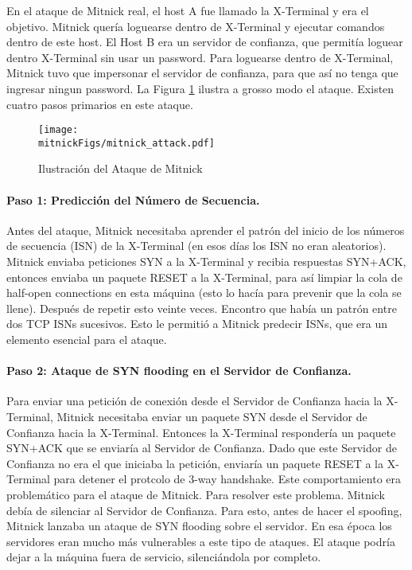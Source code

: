 En el ataque de Mitnick real, el host A fue llamado la X-Terminal y era el objetivo. Mitnick quería loguearse dentro de X-Terminal y ejecutar comandos dentro de este host.
El Host B era un servidor de confianza, que permitía loguear dentro X-Terminal sin usar un password.
Para loguearse dentro de X-Terminal, Mitnick tuvo que impersonar el servidor de confianza, para que así no tenga que ingresar ningun password. La Figura \ref{tcp:mitnick} ilustra a grosso modo el ataque.
Existen cuatro pasos primarios en este ataque.


\begin{figure}[htb]
\centering
\texttt{[image: \\mitnickFigs/mitnick\_attack.pdf]}
\caption{Ilustración del Ataque de Mitnick}
\label{tcp:mitnick}
\end{figure}


\paragraph{Paso 1: Predicción del Número de Secuencia.} 
Antes del ataque, Mitnick necesitaba aprender el patrón del inicio de los números de secuencia (ISN) de la X-Terminal (en esos días los ISN no eran aleatorios).
Mitnick enviaba peticiones SYN a la X-Terminal y recibia respuestas SYN+ACK, entonces enviaba un paquete RESET a la X-Terminal, para así limpiar la cola de half-open connections en esta máquina (esto lo hacía para prevenir que la cola se llene). Después de repetir esto veinte veces. Encontro que había un patrón entre dos TCP ISNs sucesivos. Esto le permitió a Mitnick predecir ISNs, que era un elemento esencial para el ataque.


\paragraph{Paso 2: Ataque de SYN flooding en el Servidor de Confianza.}
Para enviar una petición de conexión desde el Servidor de Confianza hacia la X-Terminal, Mitnick necesitaba enviar un paquete SYN desde el Servidor de Confianza hacia la X-Terminal. Entonces la X-Terminal respondería un paquete SYN+ACK que se enviaría al Servidor de Confianza. Dado que este Servidor de Confianza no era el que iniciaba la petición, enviaría un paquete RESET a la X-Terminal para detener el protcolo de 3-way handshake. Este comportamiento era problemático para el ataque de Mitnick.
Para resolver este problema. Mitnick debía de silenciar al Servidor de Confianza.
Para esto, antes de hacer el spoofing, Mitnick lanzaba un ataque de SYN flooding sobre el servidor. En esa época los servidores eran mucho más vulnerables a este tipo de ataques. El ataque podría dejar a la máquina fuera de servicio, silenciándola por completo.


